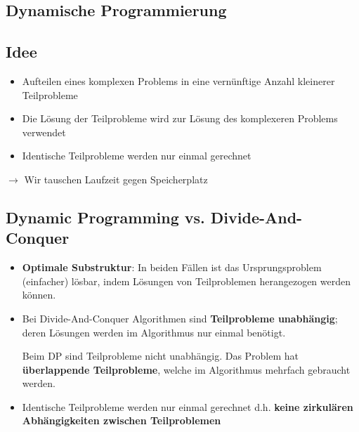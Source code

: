 \vspace{-4pt}
\begin{sectionbox}
\section{Dynamische Programmierung}
\subsection{Idee}\smallskip
\begin{itemize}
    \item Aufteilen eines komplexen Problems in eine vernünftige Anzahl kleinerer Teilprobleme
    \item Die Lösung der Teilprobleme wird zur Lösung des komplexeren Problems verwendet
    \item Identische Teilprobleme werden nur einmal gerechnet
\end{itemize}\smallskip
$\rightarrow$ Wir tauschen Laufzeit gegen Speicherplatz
\end{sectionbox}
\vspace{-4pt}
\begin{sectionbox}
\subsection{Dynamic Programming vs. Divide-And-Conquer}\smallskip
\begin{itemize}
    \item \textbf{Optimale Substruktur}: In beiden Fällen ist das Ursprungsproblem (einfacher) lösbar, indem Lösungen von Teilproblemen herangezogen werden können.
    \item Bei Divide-And-Conquer Algorithmen sind \textbf{Teilprobleme unabhängig}; deren Lösungen werden im Algorithmus nur einmal benötigt.\par
    Beim DP sind Teilprobleme nicht unabhängig. Das Problem hat \textbf{überlappende Teilprobleme}, welche im Algorithmus mehrfach gebraucht werden.
    \item Identische Teilprobleme werden nur einmal gerechnet d.h. \textbf{keine zirkulären Abhängigkeiten zwischen Teilproblemen}
\end{itemize}\smallskip
\end{sectionbox}
\vspace{-4pt}
